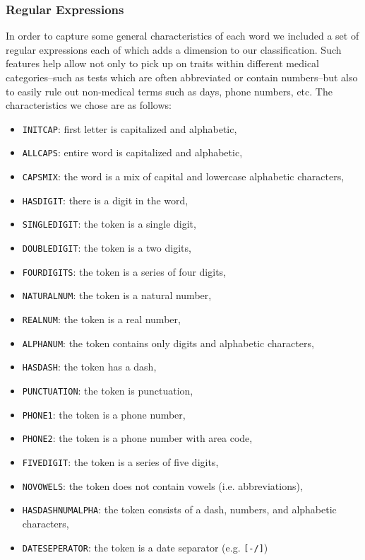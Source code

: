 \documentclass[preprint]{style}
\begin{document}
\subsubsection{Regular Expressions}
In order to capture some general characteristics of each word we included a set of regular expressions each of which adds a dimension to our classification. Such features help allow not only to pick up on traits within different medical categories--such as tests which are often abbreviated or contain numbers--but also to easily rule out non-medical terms such as days, phone numbers, etc. The characteristics we chose are as follows:
\begin{itemize}
\item {\tt INITCAP}: first letter is capitalized and alphabetic,
\item {\tt ALLCAPS}: entire word is capitalized and alphabetic,
\item {\tt CAPSMIX}: the word is a mix of capital and lowercase alphabetic characters,
\item {\tt HASDIGIT}: there is a digit in the word,
\item {\tt SINGLEDIGIT}: the token is a single digit,
\item {\tt DOUBLEDIGIT}: the token is a two digits,
\item {\tt FOURDIGITS}: the token is a series of four digits,
\item {\tt NATURALNUM}: the token is a natural number,
\item {\tt REALNUM}: the token is a real number,
\item {\tt ALPHANUM}: the token contains only digits and alphabetic characters,
\item {\tt HASDASH}: the token has a dash,
\item {\tt PUNCTUATION}: the token is punctuation,
\item {\tt PHONE1}: the token is a phone number,
\item {\tt PHONE2}: the token is a phone number with area code,
\item {\tt FIVEDIGIT}: the token is a series of five digits,
\item {\tt NOVOWELS}: the token does not contain vowels (i.e. abbreviations),
\item {\tt HASDASHNUMALPHA}: the token consists of a dash, numbers, and alphabetic characters, 
\item {\tt DATESEPERATOR}: the token is a date separator (e.g. {\tt [-/]})
\end{itemize}
\end{document}
